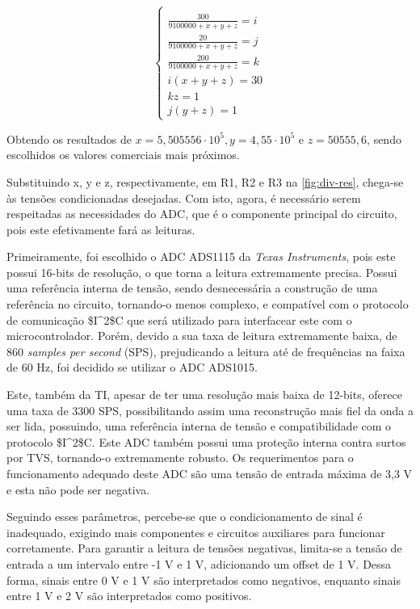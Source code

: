 \begin{equation}
    \label{eq01}
    \left\{\begin{matrix}
        \\ \frac{300}{9100000+x+y+z} = i
        \\ \frac{20}{9100000+x+y+z} = j
        \\ \frac{200}{9100000+x+y+z} = k
        \\ i (x+y+z) = 30
        \\ kz = 1
        \\ j(y+z) = 1
    \end{matrix}\right.
\end{equation}

Obtendo os resultados de $x = 5,505556 \cdot 10^{5}, y = 4,55 \cdot 10^{5}$ e $z = 50555,6$, sendo escolhidos os valores comerciais mais próximos.

Substituindo x, y e z, respectivamente, em R1, R2 e R3 na \autoref{fig:div-res}, chega-se às tensões condicionadas desejadas. Com isto, agora, é necessário serem respeitadas as necessidades do \gls{ADC}, que é o componente principal do circuito, pois este efetivamente fará as leituras.

Primeiramente, foi escolhido o \gls{ADC} ADS1115 da \textit{Texas Instruments}, pois este possui 16-bits de resolução, o que torna a leitura extremamente precisa. Possui uma referência interna de tensão, sendo desnecessária a construção de uma referência no circuito, tornando-o menos complexo, e compatível com o protocolo de comunicação \gls{$I^2$C} que será utilizado para interfacear este com o microcontrolador. Porém, devido a sua taxa de leitura extremamente baixa, de 860 \textit{samples per second} (\gls{SPS}), prejudicando a leitura até de frequências na faixa de 60 Hz, foi decidido se utilizar o \gls{ADC} ADS1015.

Este, também da \gls{TI}, apesar de ter uma resolução mais baixa de 12-bits, oferece uma taxa de 3300 \gls{SPS}, possibilitando assim uma reconstrução mais fiel da onda a ser lida, possuindo, uma referência interna de tensão e compatibilidade com o protocolo \gls{$I^2$C}. Este \gls{ADC} também possui uma proteção interna contra surtos por \gls{TVS}, tornando-o extremamente robusto. Os requerimentos para o funcionamento adequado deste \gls{ADC} são uma tensão de entrada máxima de 3,3 V e esta não pode ser negativa.

Seguindo esses parâmetros, percebe-se que o condicionamento de sinal é inadequado, exigindo mais componentes e circuitos auxiliares para funcionar corretamente. Para garantir a leitura de tensões negativas, limita-se a tensão de entrada a um intervalo entre -1 V e 1 V, adicionando um offset de 1 V. Dessa forma, sinais entre 0 V e 1 V são interpretados como negativos, enquanto sinais entre 1 V e 2 V são interpretados como positivos.

